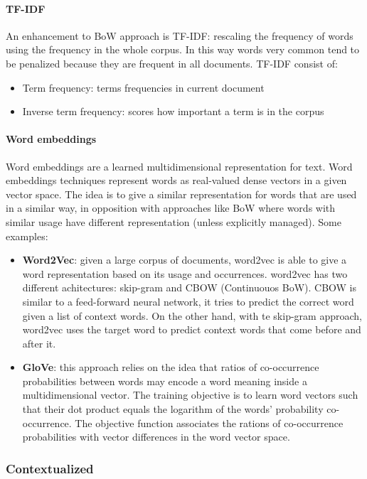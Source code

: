\documentclass[\main/main.tex]{subfiles}
\begin{document}
\paragraph{TF-IDF}
An enhancement to BoW approach is TF-IDF: rescaling the frequency of words using the frequency in the whole corpus. In this way words very common tend to be penalized because they are frequent in all documents. TF-IDF consist of:
\begin{itemize}
    \item Term frequency: terms frequencies in current document
    \item Inverse term frequency: scores how important a term is in the corpus
\end{itemize}
\paragraph{Word embeddings}
Word embeddings are a learned multidimensional representation for text. Word embeddings techniques represent words as real-valued dense vectors in a given vector space. The idea is to give a similar representation for words that are used in a similar way, in opposition with approaches like BoW where words with similar usage have different representation (unless explicitly managed). Some examples:
\begin{itemize}
    \item \textbf{Word2Vec}: given a large corpus of documents, word2vec is able to give a word representation based on its usage and occurrences. word2vec has two different achitectures: skip-gram and CBOW (Continuouos BoW). CBOW is similar to a feed-forward neural network, it tries to predict the correct word given a list of context words. On the other hand, with te skip-gram approach, word2vec uses the target word to predict context words that come before and after it.\cite{mikolov2013efficient}
    \item \textbf{GloVe}: this approach relies on the idea that ratios of co-occurrence probabilities between words may encode a word meaning inside a multidimensional vector. The training objective is to learn word vectors such that their dot product equals the logarithm of the words' probability co-occurrence. The objective function associates the rations of co-occurrence probabilities with vector differences in the word vector space. \cite{pennington2014glove}
\end{itemize}
\subsubsection{Contextualized}
\end{document}
